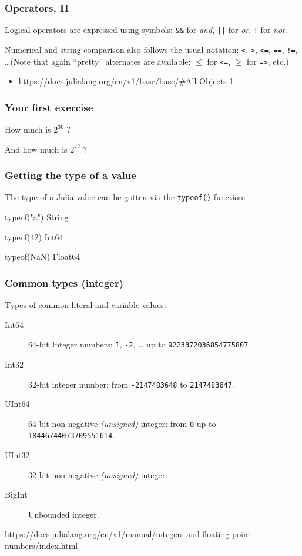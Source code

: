 \documentclass[english,serif,mathserif,xcolor=pdftex,dvipsnames,table]{beamer}
\begin{document}
\begin{frame}[fragile]
  \frametitle{Operators, II}
  Logical operators are expressed using symbols:
  \lstinline|&&| for \emph{and},
  \lstinline:||: for \emph{or},
  \lstinline|!| for \emph{not}.

  \+ Numerical and string comparison also follows the usual notation:
  \texttt{<}, \texttt{>}, \texttt{<=}, \texttt{==}, \texttt{!=},
  \ldots (Note that again ``pretty'' alternates are available:
  \texttt{$\leq$} for \texttt{<=}, \texttt{$\geq$} for \texttt{=>},
  etc.)

  \+
  \begin{references}
    \tiny
    \begin{itemize}
    \item \url{https://docs.julialang.org/en/v1/base/base/#All-Objects-1}
    \end{itemize}
  \end{references}
\end{frame}


\begin{frame}
  \frametitle{Your first exercise}
    \begin{center}
      {\Large How much is {$2^{36}$} ?}

      \+
      {\Large And how much is {$2^{72}$} ?}
    \end{center}
\end{frame}


\begin{frame}[fragile]
  \frametitle{Getting the type of a value}

  The type of a Julia value can be gotten via the \texttt{typeof()} function:
\begin{semiverbatim}
\julia typeof("a")
String

\julia typeof(42)
Int64

\julia typeof(NaN)
Float64
\end{semiverbatim}
\end{frame}


\begin{frame}[fragile]
  \frametitle{Common types (integer)}

  Types of common literal and variable values:
  \begin{description}
  \item[Int64] 64-bit Integer numbers: \texttt{1}, \texttt{-2}, \ldots
    up to \texttt{9223372036854775807}
  \item[Int32] 32-bit integer number: from \texttt{-2147483648} to \texttt{2147483647}.
  \item[UInt64] 64-bit non-negative \emph{(unsigned)} integer: from
    \texttt{0} up to \texttt{18446744073709551614}.
  \item[UInt32] 32-bit non-negative \emph{(unsigned)} integer.
  \item[BigInt] Unbounded integer.
  \end{description}

  \+
  \begin{references}
    \url{https://docs.julialang.org/en/v1/manual/integers-and-floating-point-numbers/index.html}
  \end{references}
\end{frame}
\end{document}
